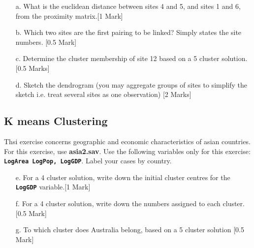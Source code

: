 \documentclass[12pt, a4paper]{article}
\theoremstyle{plain}
\theoremstyle{definition}
\theoremstyle{remark}
\begin{document}
\begin{itemize}
\item[a.] What is the euclidean distance between sites 4 and 5, and sites 1 and 6, from the proximity matrix.[1 Mark]
\item[b.] Which two sites are the first pairing to be linked? Simply states the site numbers. [0.5 Mark]
\item[c.] Determine the cluster membership of site 12 based on a 5 cluster solution. [0.5 Marks]
\item[d.] Sketch the dendrogram (you may aggregate groups of sites to simplify the sketch i.e. treat several sites as one observation) [2 Marks]
\end{itemize}
\newpage
\subsection{K means Clustering}
Thsi exercise concerns geographic and economic characteristics of asian countries. For this exercise, use \textbf{asia2.sav}. Use the following variables only for this exercise: \textbf{\texttt{LogArea
LogPop, LogGDP}}. Label your cases by country.
\begin{itemize}
\item[e.] For a 4 cluster solution, write down the initial cluster centres for the \textbf{\texttt{LogGDP}} variable.[1 Mark]
\item[f.] For a 4 cluster solution, write down the numbers assigned to each cluster. [0.5 Mark]
\item[g.] To which cluster does Australia belong, based on a 5 cluster solution [0.5 Mark]
\end{itemize}
\end{document}
